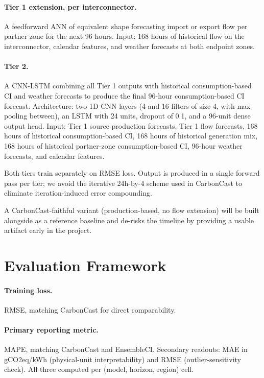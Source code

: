 \documentclass[sigconf,nonacm]{acmart}
\begin{document}
\paragraph{Tier 1 extension, per interconnector.} A feedforward ANN of equivalent shape forecasting import or export flow per partner zone for the next 96 hours. Input: 168 hours of historical flow on the interconnector, calendar features, and weather forecasts at both endpoint zones.

\paragraph{Tier 2.} A CNN-LSTM combining all Tier 1 outputs with historical consumption-based CI and weather forecasts to produce the final 96-hour consumption-based CI forecast. Architecture: two 1D CNN layers (4 and 16 filters of size 4, with max-pooling between), an LSTM with 24 units, dropout of 0.1, and a 96-unit dense output head. Input: Tier 1 source production forecasts, Tier 1 flow forecasts, 168 hours of historical consumption-based CI, 168 hours of historical generation mix, 168 hours of historical partner-zone consumption-based CI, 96-hour weather forecasts, and calendar features.

Both tiers train separately on RMSE loss. Output is produced in a single forward pass per tier; we avoid the iterative 24h-by-4 scheme used in CarbonCast to eliminate iteration-induced error compounding.

A CarbonCast-faithful variant (production-based, no flow extension) will be built alongside as a reference baseline and de-risks the timeline by providing a usable artifact early in the project.

\section{Evaluation Framework}

\paragraph{Training loss.} RMSE, matching CarbonCast for direct comparability.

\paragraph{Primary reporting metric.} MAPE, matching CarbonCast and EnsembleCI. Secondary readouts: MAE in gCO2eq/kWh (physical-unit interpretability) and RMSE (outlier-sensitivity check). All three computed per (model, horizon, region) cell.
\end{document}

